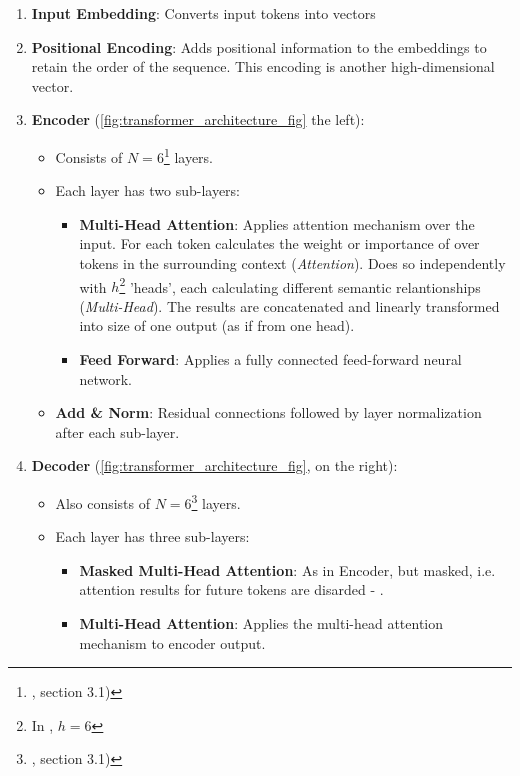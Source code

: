 \begin{enumerate}
	\item \textbf{Input Embedding}: Converts input tokens into vectors
	\item \textbf{Positional Encoding}: Adds positional information to the embeddings to retain the order of the sequence. This encoding is another high-dimensional vector.
	\item \textbf{Encoder} (\autoref{fig:transformer_architecture_fig} the left):
	      \begin{itemize}
		      \item Consists of \(N = 6\)\footnote{\cite{attention_is_all_you_need}, section 3.1)} layers.
		      \item Each layer has two sub-layers:
		            \begin{itemize}
			            \item \textbf{Multi-Head Attention}: Applies attention mechanism over the input. For each token calculates the weight or importance of over tokens in the surrounding context (\textit{Attention}). Does so independently with \(h\)\footnote{In \cite{attention_is_all_you_need}, \(h = 6\)} 'heads', each calculating different semantic relantionships (\textit{Multi-Head}). The results are concatenated and linearly transformed into size of one output (as if from one head).
			            \item \textbf{Feed Forward}: Applies a fully connected feed-forward neural network.
		            \end{itemize}
		      \item \textbf{Add \& Norm}: Residual connections followed by layer normalization after each sub-layer.
	      \end{itemize}
	\item \textbf{Decoder} (\autoref{fig:transformer_architecture_fig}, on the right):
	      \begin{itemize}
		      \item Also consists of \(N = 6\)\footnote{\cite{attention_is_all_you_need}, section 3.1)} layers.
		      \item Each layer has three sub-layers:
		            \begin{itemize}
			            \item \textbf{Masked Multi-Head Attention}: As in Encoder, but masked, i.e. attention results for future tokens are disarded - .
			            \item \textbf{Multi-Head Attention}: Applies the multi-head attention mechanism to encoder output.

\end{itemize}
\end{itemize}
\end{enumerate}
